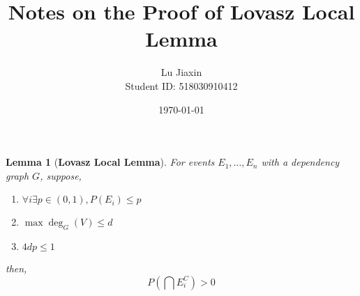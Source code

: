 \documentclass{article}
\title{Notes on the Proof of Lovasz Local Lemma}
\author{Lu Jiaxin\\
Student ID: 518030910412}
\date{\today}
\newtheorem{lemma}[theorem]{Lemma}
\begin{document}
    \maketitle
\begin{tcolorbox}
\begin{lemma}[\textbf{Lovasz Local Lemma}\cite{MR0382050}]\label{LLL}
For events $E_1, \ldots, E_n$ with a dependency graph $G$, suppose,
\begin{enumerate}[(1)]
\item $\forall i \exists p\in(0,1), P(E_i) \leq p$
\item $\max \deg_G(V) \leq d$
\item $4dp\leq 1$
\end{enumerate}
then,
\[
    P(\bigcap E_i^C) > 0
\]
\end{lemma}
\end{tcolorbox}
\end{document}
